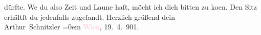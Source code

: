                dürfte. We{\geminationn} du also Zeit {\pb}und Laune haſt, möcht
               ich dich bitten zu ko{\geminationm}en. Den Sitz erhältſt du
               jedenfalls zugeſandt.\pend
           \pstart
           Herzlich grüßend dein{\\[\baselineskip]}\spacefill\mbox{Arthur Schnitzler}\pend
           \leftskip=0em{}\pstart
           \textcolor{pink}{Wien}{}\ledrightnote{\textcolor{pink}{Wien}}, 19. 4. 901.\pend
           \endnumbering{}  
      
